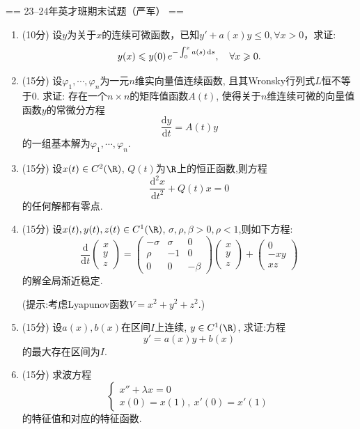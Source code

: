 == 23--24年英才班期末试题（严军） ==
\begin{enumerate}
    \item (10分)
    设$y$为关于$x$的连续可微函数，已知$y'+a(x) y \leqslant 0, \forall x > 0$，求证:
    $$y(x) \leqslant y(0) \, e^{-\int_{0}^x a(s)\,{\rm d}s}, \quad \forall x \geqslant 0.$$
    
    \item (15分)
    设$\varphi_1, \cdots, \varphi_n$为一元$n$维实向量值连续函数, 
    且其Wronsky行列式$L$恒不等于$0$. 
    求证: 存在一个$n\times n$的矩阵值函数$A(t)$, 
    使得关于$n$维连续可微的向量值函数$y$的常微分方程
    $$\frac{\mathrm{d}y}{\mathrm{d}t} = A(t) y$$
    的一组基本解为$\varphi_1, \cdots, \varphi_n$.
    
    \item (15分)
    设$x(t)\in C^2(\R)$, $Q(t)$为$\R$上的恒正函数,则方程
    $$\frac{\mathrm{d}^2x}{\mathrm{d}t^2} + Q(t) x  = 0$$
    的任何解都有零点.

    \item (15分)
    设$x(t), y(t), z(t) \in C^1(\R)$, $\sigma, \rho, \beta > 0, \rho < 1$,则如下方程:
    $$\frac{\mathrm{d}}{\mathrm{d}t} \begin{pmatrix}x \\y \\z\end{pmatrix} 
    = \begin{pmatrix}
        -\sigma &\sigma &0 \\
        \rho &-1 &0 \\
        0 &0 &-\beta
    \end{pmatrix}
    \begin{pmatrix}x \\y \\z\end{pmatrix} 
     + 
    \begin{pmatrix}0\\-xy\\xz\end{pmatrix}$$
     的解全局渐近稳定.

     (提示:考虑Lyapunov函数$V = x^2 + y^2 + z^2$.)
    
    \item (15分)
    设$a(x), b(x)$在区间$I$上连续, $y \in C^1(\R)$, 求证:方程
    $$y' = a(x) y + b(x)$$
    的最大存在区间为$I$.

    \item (15分)
    求波方程
    $$\begin{cases}
        x'' + \lambda x = 0\\
        x(0) = x(1),\ x'(0) = x'(1)
    \end{cases}$$
    的特征值和对应的特征函数.
   

\end{enumerate}
